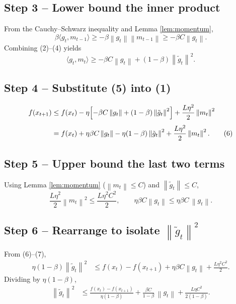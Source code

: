 \documentclass{article}
\newcommand{\norm}[1]{\left\lVert#1\right\rVert}
\begin{document}
\subsection*{Step 3 – Lower bound the inner product}
From the Cauchy–Schwarz inequality and Lemma \ref{lem:momentum},
\[
\beta\langle g_t,m_{t-1}\rangle
   \ge -\beta\norm{g_t}\norm{m_{t-1}}
   \ge -\beta C\norm{g_t} . \tag{4}
\]
Combining (2)–(4) yields
\[
\langle g_t,m_t\rangle
   \ge -\beta C\norm{g_t}+(1-\beta)\norm{\tilde g_t}^2 . \tag{5}
\]

\subsection*{Step 4 – Substitute (5) into (1)}
\begin{align}
    f(x_{t+1})
    &\le f(x_t)-\eta\Bigl[-\beta C\norm{g_t}+(1-\beta)\norm{\tilde g_t}^2\Bigr]
          +\frac{L\eta^2}{2}\norm{m_t}^2 \nonumber\\[4pt]
    &= f(x_t)+\eta\beta C\norm{g_t}
       -\eta(1-\beta)\norm{\tilde g_t}^2
       +\frac{L\eta^2}{2}\norm{m_t}^2 . \tag{6}
\end{align}

\subsection*{Step 5 – Upper bound the last two terms}
Using Lemma \ref{lem:momentum} ($\norm{m_t}\le C$) and $\norm{\tilde g_t}\le C$,
\[
\frac{L\eta^2}{2}\norm{m_t}^2 \le \frac{L\eta^2 C^2}{2},
\qquad
\eta\beta C\norm{g_t}\le \eta\beta C\,\norm{g_t}. \tag{7}
\]

\subsection*{Step 6 – Rearrange to isolate $\norm{\tilde g_t}^2$}
From (6)–(7),
\begin{align}
    \eta(1-\beta)\norm{\tilde g_t}^2
    &\le f(x_t)-f(x_{t+1})
      +\eta\beta C\norm{g_t}
      +\frac{L\eta^2 C^2}{2} . \tag{8}
\end{align}
Dividing by $\eta(1-\beta)$,
\begin{align}
    \norm{\tilde g_t}^2
    &\le \frac{f(x_t)-f(x_{t+1})}{\eta(1-\beta)}
       +\frac{\beta C}{1-\beta}\,\norm{g_t}
       +\frac{L\eta C^2}{2(1-\beta)} . \tag{9}
\end{align}
\end{document}
